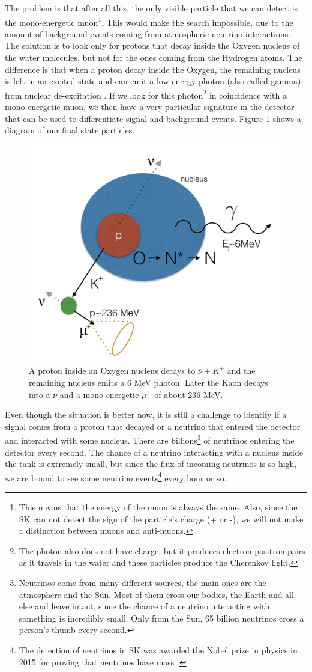 The problem is that after all this, the only visible particle that we can detect is the mono-energetic muon\footnote{This means that the energy of the muon is always the same. Also, since the SK can not detect the sign of the particle's charge (+ or -), we will not make a distinction between muons and anti-muons.}. This would make the search impossible, due to the amount of background events coming from atmospheric neutrino interactions. The solution is to look only for protons that decay inside the Oxygen nucleus of the water molecules, but not for the ones coming from the Hydrogen atoms. The difference is that when a proton decay inside the Oxygen, the remaining nucleus is left in an excited state and can emit a low energy photon (also called gamma) from nuclear de-excitation \cite{Gamma}. If we look for this photon\footnote{The photon also does not have charge, but it produces electron-positron pairs as it travels in the water and these particles produce the Cherenkov light.} in coincidence with a mono-energetic muon, we then have a very particular signature in the detector that can be used to differentiate signal and background events. Figure \ref{fig:pdecay} shows a diagram of our final state particles.

\begin{figure}[h]
  \centering
  \includegraphics[width=0.37\linewidth]{figs/mugamma_mode.png}
  \caption{A proton inside an Oxygen nucleus decays to $\bar{\nu} + K^{+}$ and the remaining nucleus emits a 6 MeV photon. Later the Kaon decays into a $\nu$  and a mono-energetic  $\mu^{+}$ of about 236 MeV.}
  \label{fig:pdecay}
\end{figure}

Even though the situation is better now, it is still a challenge to identify if a signal comes from a proton that decayed or a neutrino that entered the detector and interacted with some nucleus. There are billions\footnote{Neutrinos come from many different sources, the main ones are the atmosphere and the Sun. Most of them cross our bodies, the Earth and all else and leave intact, since the chance of a neutrino interacting with something is incredibly small. Only from the Sun, 65 billion neutrinos cross a  person's thumb every second.} of neutrinos entering the detector every second. The chance of a neutrino interacting with a nucleus inside the tank is extremely small, but since the flux of incoming neutrinos is so high, we are bound to see some neutrino events\footnote{The detection of neutrinos in SK was awarded the Nobel prize in physics in 2015 for proving that neutrinos have mass \cite{Nobel}.} every hour or so.

